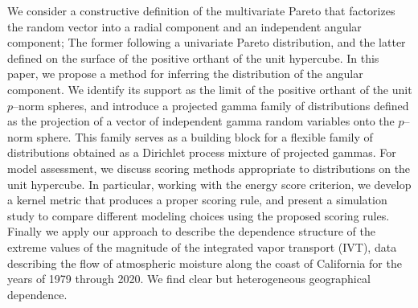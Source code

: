 We consider a constructive definition of the multivariate Pareto that factorizes the 
random vector into a radial component and an independent angular component; The former
following a univariate Pareto distribution, and the latter defined on the surface of the 
positive orthant of the unit hypercube.  In this paper, we  propose a method for
inferring the distribution of the angular component.  We identify its support 
as the limit of the positive orthant of the unit $p$--norm spheres,
and introduce a projected gamma family of
distributions defined as the projection of a vector of independent gamma random variables
onto the $p$--norm sphere.  This family serves as a building block for a flexible family
of distributions obtained as a Dirichlet process mixture of projected gammas.  For 
model assessment, we discuss scoring methods appropriate 
to distributions on the unit hypercube.  In particular, working with the energy score
criterion, we develop a kernel metric that produces a 
proper scoring rule, and present a simulation study to compare 
different modeling choices using the proposed scoring rules.  Finally we apply our 
approach to describe the dependence structure of the extreme values of the magnitude 
of the integrated vapor transport (IVT), data describing the flow 
of atmospheric moisture along the coast of California for the years of 1979 
through 2020.  We find clear but heterogeneous geographical dependence.

